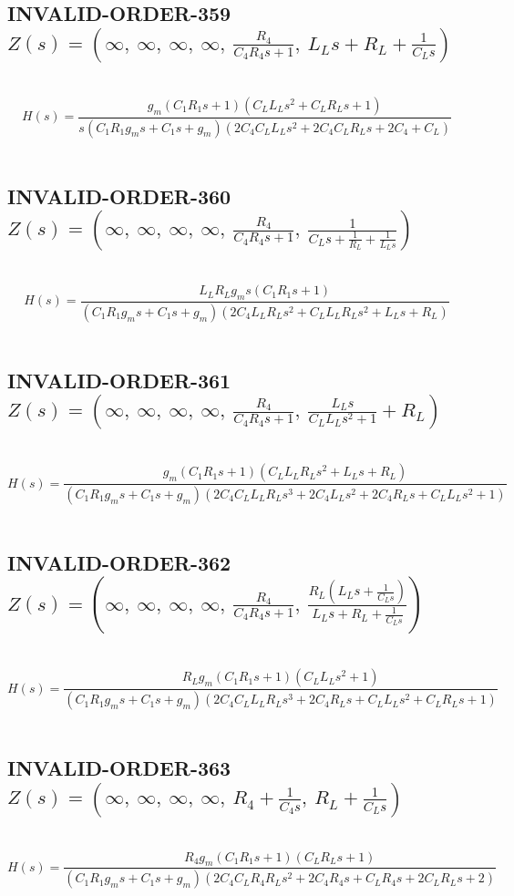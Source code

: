 \documentclass{article}
\begin{document}
\subsection{INVALID-ORDER-359 $Z(s) = \left( \infty, \  \infty, \  \infty, \  \infty, \  \frac{R_{4}}{C_{4} R_{4} s + 1}, \  L_{L} s + R_{L} + \frac{1}{C_{L} s}\right)$ } \ 
\textbf{\[H(s) = \frac{g_{m} \left(C_{1} R_{1} s + 1\right) \left(C_{L} L_{L} s^{2} + C_{L} R_{L} s + 1\right)}{s \left(C_{1} R_{1} g_{m} s + C_{1} s + g_{m}\right) \left(2 C_{4} C_{L} L_{L} s^{2} + 2 C_{4} C_{L} R_{L} s + 2 C_{4} + C_{L}\right)}\] } \ 
\subsection{INVALID-ORDER-360 $Z(s) = \left( \infty, \  \infty, \  \infty, \  \infty, \  \frac{R_{4}}{C_{4} R_{4} s + 1}, \  \frac{1}{C_{L} s + \frac{1}{R_{L}} + \frac{1}{L_{L} s}}\right)$ } \ 
\textbf{\[H(s) = \frac{L_{L} R_{L} g_{m} s \left(C_{1} R_{1} s + 1\right)}{\left(C_{1} R_{1} g_{m} s + C_{1} s + g_{m}\right) \left(2 C_{4} L_{L} R_{L} s^{2} + C_{L} L_{L} R_{L} s^{2} + L_{L} s + R_{L}\right)}\] } \ 
\subsection{INVALID-ORDER-361 $Z(s) = \left( \infty, \  \infty, \  \infty, \  \infty, \  \frac{R_{4}}{C_{4} R_{4} s + 1}, \  \frac{L_{L} s}{C_{L} L_{L} s^{2} + 1} + R_{L}\right)$ } \ 
\textbf{\[H(s) = \frac{g_{m} \left(C_{1} R_{1} s + 1\right) \left(C_{L} L_{L} R_{L} s^{2} + L_{L} s + R_{L}\right)}{\left(C_{1} R_{1} g_{m} s + C_{1} s + g_{m}\right) \left(2 C_{4} C_{L} L_{L} R_{L} s^{3} + 2 C_{4} L_{L} s^{2} + 2 C_{4} R_{L} s + C_{L} L_{L} s^{2} + 1\right)}\] } \ 
\subsection{INVALID-ORDER-362 $Z(s) = \left( \infty, \  \infty, \  \infty, \  \infty, \  \frac{R_{4}}{C_{4} R_{4} s + 1}, \  \frac{R_{L} \left(L_{L} s + \frac{1}{C_{L} s}\right)}{L_{L} s + R_{L} + \frac{1}{C_{L} s}}\right)$ } \ 
\textbf{\[H(s) = \frac{R_{L} g_{m} \left(C_{1} R_{1} s + 1\right) \left(C_{L} L_{L} s^{2} + 1\right)}{\left(C_{1} R_{1} g_{m} s + C_{1} s + g_{m}\right) \left(2 C_{4} C_{L} L_{L} R_{L} s^{3} + 2 C_{4} R_{L} s + C_{L} L_{L} s^{2} + C_{L} R_{L} s + 1\right)}\] } \ 
\subsection{INVALID-ORDER-363 $Z(s) = \left( \infty, \  \infty, \  \infty, \  \infty, \  R_{4} + \frac{1}{C_{4} s}, \  R_{L} + \frac{1}{C_{L} s}\right)$ } \ 
\textbf{\[H(s) = \frac{R_{4} g_{m} \left(C_{1} R_{1} s + 1\right) \left(C_{L} R_{L} s + 1\right)}{\left(C_{1} R_{1} g_{m} s + C_{1} s + g_{m}\right) \left(2 C_{4} C_{L} R_{4} R_{L} s^{2} + 2 C_{4} R_{4} s + C_{L} R_{4} s + 2 C_{L} R_{L} s + 2\right)}\] } \ 
\end{document}
